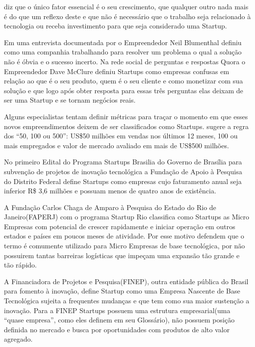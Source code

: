 \cite{Graham2012} diz que o único fator essencial é o seu crescimento, que qualquer outro nada mais é do que um reflexo deste e que não é necessário que o trabalho seja relacionado à tecnologia ou receba investimento para que seja considerado uma Startup.

Em uma entrevista documentada por \cite{Robehmed2013} o Empreendedor Neil Blumenthal definiu como uma companhia trabalhando para resolver um problema o qual a solução não é óbvia e o sucesso incerto. Na rede social de perguntas e respostas Quora o Empreendedor Dave McClure definiu Startups como empresas confusas em relação ao que é o seu produto, quem é o seu cliente e como monetizar com sua solução e que logo após obter resposta para essas três perguntas elas deixam de ser uma Startup e se tornam negócios reais.

Alguns especialistas tentam definir métricas para traçar o momento em que esses novos empreendimentos deixem de ser classificados como Startups. \cite{Wilhelm2014} sugere a regra dos ``50, 100 ou 500'': US\$50 milhões em vendas nos últimos 12 meses, 100 ou mais empregados e valor de mercado avaliado em mais de US\$500 milhões.   

No primeiro Edital do Programa Startups Brasilia do Governo de Brasília para subvenção de projetos de inovação tecnológica a Fundação de Apoio à Pesquisa do Distrito Federal define Startups como empresas cujo faturamento anual seja inferior R\$ 3,6 milhões e possuam menos de quatro anos de existência. 

A Fundação Carlos Chaga de Amparo à Pesquisa do Estado do Rio de Janeiro(FAPERJ) com o programa Startup Rio classifica como Startups as Micro Empresas com potencial de crescer rapidamente e iniciar operação em outros estados e países em poucos meses de atividade. Por esse motivo defendem que o termo é comumente utilizado para Micro Empresas de base tecnológica, por não possuirem tantas barreiras logísticas que impeçam uma expansão tão grande e tão rápido.

A Financiadora de Projetos e Pesquisa(FINEP), outra entidade pública do Brasil para fomento à inovação, define Startup como uma Empresa Nascente de Base Tecnológica sujeita a frequentes mudanças e que tem como sua maior sustenção a inovação. Para a FINEP Startups possuem uma estrutura empresarial(uma ``quase empresa'', como eles definem em seu Glossário), não possuem posição definida no mercado e busca por oportunidades com produtos de alto valor agregado.

